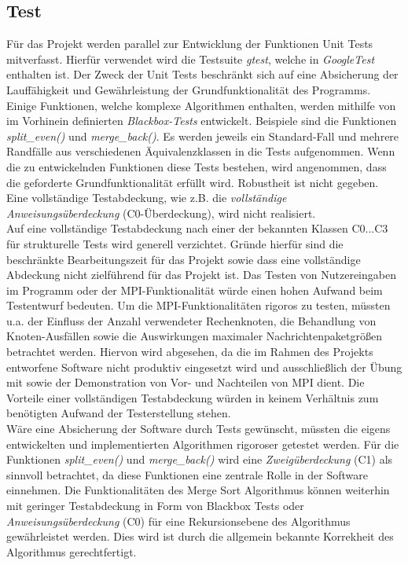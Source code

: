 \subsection{Test}
Für das Projekt werden parallel zur Entwicklung der Funktionen Unit Tests mitverfasst. Hierfür verwendet wird die Testsuite \textit{gtest}, welche in \textit{GoogleTest} enthalten ist. Der Zweck der Unit Tests beschränkt sich auf eine Absicherung der Lauffähigkeit und Gewährleistung der Grundfunktionalität des Programms.
\\
Einige Funktionen, welche komplexe Algorithmen enthalten, werden mithilfe von im Vorhinein definierten \textit{Blackbox-Tests} entwickelt. Beispiele sind die Funktionen \textit{split\_even()} und \textit{merge\_back()}. Es werden jeweils ein Standard-Fall und mehrere Randfälle aus verschiedenen Äquivalenzklassen in die Tests aufgenommen. 
Wenn die zu entwickelnden Funktionen diese Tests bestehen, wird angenommen, dass die geforderte Grundfunktionalität erfüllt wird. Robustheit ist nicht gegeben. Eine vollständige Testabdeckung,
wie z.B. die \textit{vollständige Anweisungsüberdeckung} (C0-Überdeckung), wird nicht realisiert.
\\
Auf eine vollständige Testabdeckung nach einer der bekannten Klassen C0...C3 für strukturelle Tests wird generell verzichtet. Gründe hierfür sind die beschränkte Bearbeitungszeit für das Projekt sowie dass eine vollständige Abdeckung nicht zielführend für das Projekt ist. Das Testen von Nutzereingaben im Programm oder der MPI-Funktionalität würde einen hohen Aufwand beim Testentwurf bedeuten. Um die MPI-Funktionalitäten rigoros zu testen, müssten u.a. der Einfluss der Anzahl verwendeter Rechenknoten, die Behandlung von Knoten-Ausfällen sowie die Auswirkungen maximaler Nachrichtenpaketgrößen betrachtet werden. Hiervon wird abgesehen, da die im Rahmen des Projekts entworfene Software nicht produktiv eingesetzt wird und ausschließlich der Übung mit sowie der Demonstration von Vor- und Nachteilen von MPI dient. Die Vorteile einer vollständigen Testabdeckung würden in keinem Verhältnis zum benötigten Aufwand der Testerstellung stehen.
\\
Wäre eine Absicherung der Software durch Tests gewünscht, müssten die eigens entwickelten und implementierten Algorithmen rigoroser getestet werden. Für die Funktionen \textit{split\_even()} und \textit{merge\_back()} wird eine \textit{Zweigüberdeckung} (C1) als sinnvoll betrachtet, da diese Funktionen eine zentrale Rolle in der Software einnehmen. Die Funktionalitäten des Merge Sort Algorithmus können weiterhin mit geringer Testabdeckung in Form von Blackbox Tests oder \textit{Anweisungsüberdeckung} (C0) für eine Rekursionsebene des Algorithmus gewährleistet werden.
Dies wird ist durch die allgemein bekannte Korrekheit des Algorithmus gerechtfertigt.